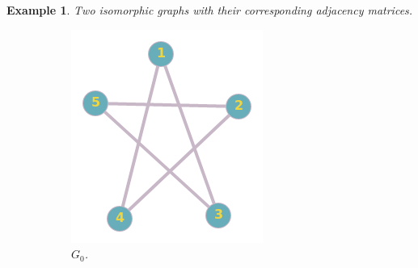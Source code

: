 \documentclass[12pt,a4paper]{article}
\newtheorem{exa}[thm]{Example}
\begin{document}
\begin{exa}
 Two isomorphic graphs with their corresponding adjacency matrices.
\begin{figure}[h!]
	\centering
	\begin{subfigure}[b]{.29\linewidth}
		\includegraphics[width=\linewidth]{ex1_1.png}
		\caption{$G_0$.}
	\end{subfigure}
	\begin{subfigure}[b]{.24\linewidth}

\end{subfigure}
\end{figure}
\end{exa}
\end{document}

